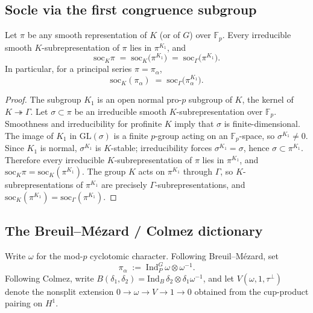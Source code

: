 \subsection{Socle via the first congruence subgroup}
\begin{theorem}\label{thm:soc-k1}
Let $\pi$ be any smooth representation of $K$ (or of $G$) over $\mathbb{F}_p$. Every irreducible smooth $K$-subrepresentation of $\pi$ lies in $\pi^{K_1}$, and
\[
\mathrm{soc}_K\pi \;=\; \mathrm{soc}_K\bigl(\pi^{K_1}\bigr) \;=\; \mathrm{soc}_\Gamma\bigl(\pi^{K_1}\bigr).
\]
In particular, for a principal series $\pi=\pi_\alpha$,
\[
\mathrm{soc}_K(\pi_\alpha)\;=\;\mathrm{soc}_\Gamma\bigl(\pi_\alpha^{K_1}\bigr).
\]
\end{theorem}
\begin{proof}
The subgroup $K_1$ is an open normal pro-$p$ subgroup of $K$, the kernel of $K\twoheadrightarrow\Gamma$. Let $\sigma\subset\pi$ be an irreducible smooth $K$-subrepresentation over $\mathbb{F}_p$. Smoothness and irreducibility for profinite $K$ imply that $\sigma$ is finite-dimensional. The image of $K_1$ in $\mathrm{GL}(\sigma)$ is a finite $p$-group acting on an $\mathbb{F}_p$-space, so $\sigma^{K_1}\ne0$. Since $K_1$ is normal, $\sigma^{K_1}$ is $K$-stable; irreducibility forces $\sigma^{K_1}=\sigma$, hence $\sigma\subset\pi^{K_1}$. Therefore every irreducible $K$-subrepresentation of $\pi$ lies in $\pi^{K_1}$, and $\mathrm{soc}_K\pi=\mathrm{soc}_K(\pi^{K_1})$. The group $K$ acts on $\pi^{K_1}$ through $\Gamma$, so $K$-subrepresentations of $\pi^{K_1}$ are precisely $\Gamma$-subrepresentations, and $\mathrm{soc}_K(\pi^{K_1})=\mathrm{soc}_\Gamma(\pi^{K_1})$.
\end{proof}

\subsection{The Breuil--M\'ezard / Colmez dictionary}
Write $\omega$ for the mod-$p$ cyclotomic character. Following Breuil--M\'ezard, set
\[
\pi_\alpha \;:=\; \mathrm{Ind}_P^G\,\omega\otimes\omega^{-1}.
\]
Following Colmez, write $B(\delta_1,\delta_2)=\mathrm{Ind}_B\,\delta_2\otimes\delta_1\omega^{-1}$, and let $V(\omega,1,\tau^\perp)$ denote the nonsplit extension $0\to\omega\to V\to 1\to0$ obtained from the cup-product pairing on $H^1$.

